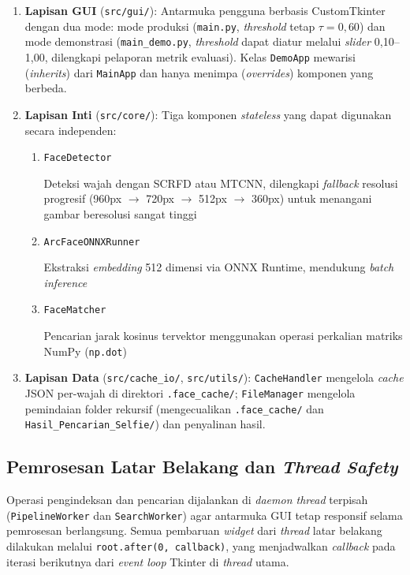 \begin{enumerate}
    \item \textbf{Lapisan GUI} (\texttt{src/gui/}): Antarmuka pengguna berbasis CustomTkinter dengan dua mode: mode produksi (\texttt{main.py}, \textit{threshold} tetap $\tau = 0{,}60$) dan mode demonstrasi (\texttt{main\_demo.py}, \textit{threshold} dapat diatur melalui \textit{slider} 0,10–1,00, dilengkapi pelaporan metrik evaluasi). Kelas \texttt{DemoApp} mewarisi (\textit{inherits}) dari \texttt{MainApp} dan hanya menimpa (\textit{overrides}) komponen yang berbeda.

    \item \textbf{Lapisan Inti} (\texttt{src/core/}): Tiga komponen \textit{stateless} yang dapat digunakan secara independen:
    \begin{enumerate}
        \item \texttt{FaceDetector}
        
        Deteksi wajah dengan SCRFD atau MTCNN, dilengkapi \textit{fallback} resolusi progresif (960px $\rightarrow$ 720px $\rightarrow$ 512px $\rightarrow$ 360px) untuk menangani gambar beresolusi sangat tinggi
        \item \texttt{ArcFaceONNXRunner}
        
        Ekstraksi \textit{embedding} 512 dimensi via ONNX Runtime, mendukung \textit{batch inference}
        \item \texttt{FaceMatcher}
        
        Pencarian jarak kosinus tervektor menggunakan operasi perkalian matriks NumPy (\texttt{np.dot})
    \end{enumerate}

    \item \textbf{Lapisan Data} (\texttt{src/cache\_io/}, \texttt{src/utils/}): \texttt{CacheHandler} mengelola \textit{cache} JSON per-wajah di direktori \texttt{.face\_cache/}; \texttt{FileManager} mengelola pemindaian folder rekursif (mengecualikan \texttt{.face\_cache/} dan \texttt{Hasil\_Pencarian\_Selfie/}) dan penyalinan hasil.
\end{enumerate}

\subsection{Pemrosesan Latar Belakang dan \textit{Thread Safety}}

Operasi pengindeksan dan pencarian dijalankan di \textit{daemon thread} terpisah (\texttt{PipelineWorker} dan \texttt{SearchWorker}) agar antarmuka GUI tetap responsif selama pemrosesan berlangsung. Semua pembaruan \textit{widget} dari \textit{thread} latar belakang dilakukan melalui \texttt{root.after(0, callback)}, yang menjadwalkan \textit{callback} pada iterasi berikutnya dari \textit{event loop} Tkinter di \textit{thread} utama.

